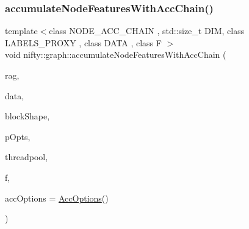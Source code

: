 \subsubsection{\texorpdfstring{accumulate\+Node\+Features\+With\+Acc\+Chain()}{accumulateNodeFeaturesWithAccChain()}\hspace{0.1cm}{\footnotesize\ttfamily [1/2]}}
{\footnotesize\ttfamily template$<$class N\+O\+D\+E\+\_\+\+A\+C\+C\+\_\+\+C\+H\+A\+IN , std\+::size\+\_\+t D\+IM, class L\+A\+B\+E\+L\+S\+\_\+\+P\+R\+O\+XY , class D\+A\+TA , class F $>$ \\
void nifty\+::graph\+::accumulate\+Node\+Features\+With\+Acc\+Chain (\begin{DoxyParamCaption}\item[{const \hyperlink{classnifty_1_1graph_1_1GridRag}{Grid\+Rag}$<$ D\+IM, L\+A\+B\+E\+L\+S\+\_\+\+P\+R\+O\+XY $>$ \&}]{rag,  }\item[{const D\+A\+TA \&}]{data,  }\item[{const \hyperlink{namespacenifty_1_1array_a683f151f19c851754e0c6d55ed16a0c2}{array\+::\+Static\+Array}$<$ int64\+\_\+t, D\+IM $>$ \&}]{block\+Shape,  }\item[{const \hyperlink{classnifty_1_1parallel_1_1ParallelOptions}{parallel\+::\+Parallel\+Options} \&}]{p\+Opts,  }\item[{\hyperlink{classnifty_1_1parallel_1_1ThreadPool}{parallel\+::\+Thread\+Pool} \&}]{threadpool,  }\item[{F \&\&}]{f,  }\item[{const \hyperlink{structnifty_1_1graph_1_1AccOptions}{Acc\+Options} \&}]{acc\+Options = {\ttfamily \hyperlink{structnifty_1_1graph_1_1AccOptions}{Acc\+Options}()} }\end{DoxyParamCaption})}

\mbox{\label{namespacenifty_1_1graph_a1464a1e4da963bdaf932c41c042f734e}} 
